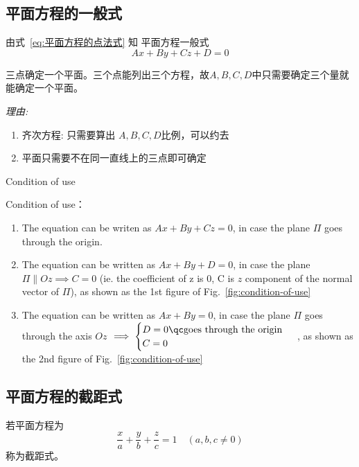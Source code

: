 \subsection{平面方程的一般式}%
由式~\eqref{eq:平面方程的点法式} 知 平面方程一般式
\begin{equation}
	\label{eq:平面方程一般式}
	Ax + By + Cz + D = 0
\end{equation}
\begin{remark}
	三点确定一个平面。三个点能列出三个方程，故\( A,B,C,D \)中只需要确定三个量就能确定一个平面。\\[2\baselineskip]

	{\itshape 理由:
	\begin{enumerate}
		\item 齐次方程: 只需要算出 \( A,B,C,D \)比例，可以约去
		\item 平面只需要不在同一直线上的三点即可确定
	\end{enumerate}}
\end{remark}
\begin{marginfigure}
	\centering
	
	\caption{Condition of use}
	\label{fig:condition-of-use}
\end{marginfigure}
Condition of use：
\begin{enumerate}
	\item  The equation can be writen as
	      \( Ax + By + Cz = 0 \),
	      in case the plane \( \Pi \) goes through the origin.
	\item  The equation can be written as \( A x + B y + D =0 \),
	      in case the plane \( \Pi \parallel  Oz \implies C =0 \) (ie. the coefficient of z is 0, C is \( z \) component of the normal vector of \( \Pi \)),
	      as shown as the 1st figure of Fig.~\ref{fig:condition-of-use}
	\item The equation can be written as \( A x + B y =0 \),
	      in case the plane \( \Pi \) goes through the axis \( Oz \)
	      \( \implies
	      \begin{cases}
		      D = 0 \qc \text{goes through the origin} \\
		      C = 0
	      \end{cases}
	      \)
	      , as shown as the 2nd figure of Fig.~\ref{fig:condition-of-use}
\end{enumerate}

\subsection{平面方程的截距式}%
\begin{definition}[平面方程的截距式]
	若平面方程为
	\begin{equation*}
		\frac{x}{a} + \frac{y}{b} + \frac{z}{c} = 1 \quad (a,b,c \neq 0)
	\end{equation*}
	称为截距式。
\end{definition}

